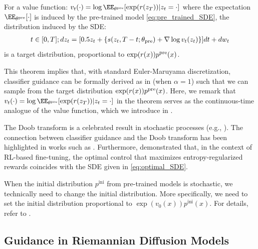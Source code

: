 \begin{Thmbox}{}
\begin{theorem}\label{thm:doob}
For a value function: $v_t(\cdot) = \log \EE_{\theta^{\pre}}[\exp(r(z_T))|z_t=\cdot]$ where the expectation $\EE_{\theta^{\pre}}[\cdot]$ is  induced by the pre-trained model \eqref{eq:pre_trained_SDE}, the distribution induced by the SDE: 
\begin{align}\label{eq:optimal_SDE}
 t \in [0,T];    dz_t = [0.5z_t + \{ s(z_{t},T-t; \theta_{\mathrm{pre}})+ \nabla \log v_t(z_t)  \}]dt + dw_t
\end{align}
is a target distribution, proportional to $\exp(r(x))p^{\mathrm{pre}}(x)$. 
\end{theorem}
\end{Thmbox}

This theorem implies that, with standard Euler-Maruyama discretization, classifier guidance can be formally derived as in  (when $\alpha=1$) such that we can sample from the target distribution $\exp(r(x))p^{\mathrm{pre}}(x)$. Here, we remark that $v_t(\cdot) = \log \EE_{\theta^{\pre}}[\exp(r(z_T))|z_t=\cdot]$ in the theorem serves as the continuous-time analogue of the value function, which we introduce in .

The Doob transform is a celebrated result in stochastic processes (e.g., \citet[Chapter 3]{chetrite2015nonequilibrium}). The connection between classifier guidance and the Doob transform has been highlighted in works such as \citet{zhao2024adding,denker2024deft}. Furthermore, \citet{uehara2024finetuning,denker2024deft} demonstrated that, in the context of RL-based fine-tuning, the optimal control that maximizes entropy-regularized rewards coincides with the SDE given in \eqref{eq:optimal_SDE}.


\begin{remark}
When the initial distribution $p^\mathrm{ini}$ from pre-trained models is stochastic, we technically need to change the initial distribution. More specifically, we need to set the initial distribution proportional to  $
    \exp(v_0(x))p^{\mathrm{ini}}(x). $
For details, refer to \citet{uehara2024finetuning}. 
\end{remark}






\subsection{Guidance in Riemannian Diffusion Models}

